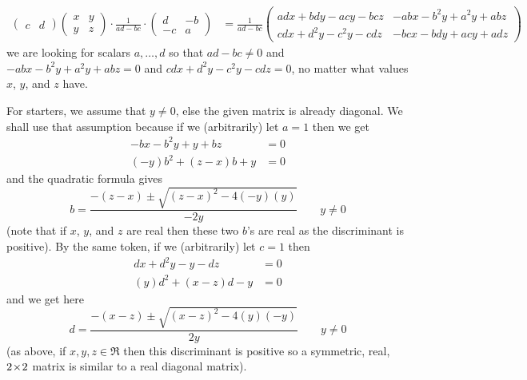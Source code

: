 \begin{exercises}
\begin{answer}
\begin{exparts}
\begin{align*}
\begin{pmatrix}
              c  &d
           \end{pmatrix}
           \begin{pmatrix}
              x  &y  \\
              y  &z
           \end{pmatrix}
           \cdot\frac{1}{ad-bc}\cdot
           \begin{pmatrix}
              d  &-b \\
             -c  &a
           \end{pmatrix}
           &=\frac{1}{ad-bc}
           \begin{pmatrix}
              adx+bdy-acy-bcz    &-abx-b^2y+a^2y+abz \\
              cdx+d^2y-c^2y-cdz  &-bcx-bdy+acy+adz
           \end{pmatrix}
        \end{align*}
        we are looking for scalars \( a,\ldots,d \) so that
        \( ad-bc\neq 0 \) and
        \( -abx-b^2y+a^2y+abz=0 \)
        and \( cdx+d^2y-c^2y-cdz=0 \), no matter what values
        \( x \), \( y \), and \( z \) have.

        For starters, we assume that \( y\neq 0 \), else the given matrix is
        already diagonal.
        We shall use that assumption because if we (arbitrarily) let
        \( a=1 \) then we get
        \begin{align*}
           -bx-b^2y+y+bz
           &=0              \\
           (-y)b^2+(z-x)b+y
           &=0
        \end{align*}
        and the quadratic formula gives
        \begin{equation*}
           b=\frac{-(z-x)\pm\sqrt{(z-x)^2-4(-y)(y)} }{-2y}
           \qquad
           y\neq 0
        \end{equation*}
        (note that if \( x \), \( y \), and \( z \) are real then these two
         \( b \)'s are real as the discriminant is positive).
        By the same token, if we (arbitrarily) let \( c=1 \) then
        \begin{align*}
           dx+d^2y-y-dz
           &=0              \\
           (y)d^2+(x-z)d-y
           &=0
        \end{align*}
        and we get here
        \begin{equation*}
           d=\frac{-(x-z)\pm\sqrt{(x-z)^2-4(y)(-y)} }{2y}
           \qquad
           y\neq 0
        \end{equation*}
        (as above, if \( x,y,z\in\Re \) then this discriminant is positive
        so a symmetric, real, \( 2 \! \times \! 2 \) matrix is similar to a real
        diagonal matrix).


\end{exparts}
\end{answer}
\end{exercises}
